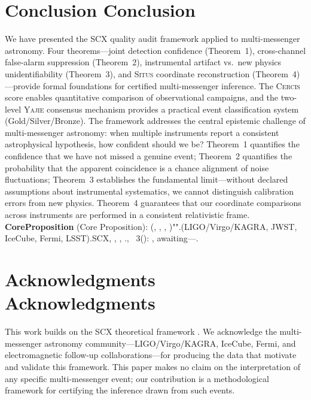 \documentclass[11pt,a4paper]{article}
\theoremstyle{definition}
\newcommand{\Situs}{\textsc{Situs}}
\newcommand{\Yajie}{\textsc{Yajie}}
\newcommand{\Cercis}{\textsc{Cercis}}
\newcommand{\SCX}{\textsc{SCX}}
\begin{document}
\section*{Conclusion Conclusion}
We have presented the \SCX{} quality audit framework applied to multi-messenger astronomy. Four theorems---joint detection confidence (Theorem~1), cross-channel false-alarm suppression (Theorem~2), instrumental artifact vs.\ new physics unidentifiability (Theorem~3), and \Situs{} coordinate reconstruction (Theorem~4)---provide formal foundations for certified multi-messenger inference. The \Cercis{} score enables quantitative comparison of observational campaigns, and the two-level \Yajie{} consensus mechanism provides a practical event classification system (Gold/Silver/Bronze).
The framework addresses the central epistemic challenge of multi-messenger astronomy: when multiple instruments report a consistent astrophysical hypothesis, how confident should we be? Theorem~1 quantifies the confidence that we have not missed a genuine event; Theorem~2 quantifies the probability that the apparent coincidence is a chance alignment of noise fluctuations; Theorem~3 establishes the fundamental limit---without declared assumptions about instrumental systematics, we cannot distinguish calibration errors from new physics. Theorem~4 guarantees that our coordinate comparisons across instruments are performed in a consistent relativistic frame.
\textbf{CoreProposition} (Core Proposition): (, , , )"".(LIGO/Virgo/KAGRA, JWST, IceCube, Fermi, LSST).\SCX{}, , , ., ~3(): , awaiting---.
\section*{Acknowledgments Acknowledgments}
This work builds on the \SCX{} theoretical framework \cite{SCX2025}. We acknowledge the multi-messenger astronomy community---LIGO/Virgo/KAGRA, IceCube, Fermi, and electromagnetic follow-up collaborations---for producing the data that motivate and validate this framework. This paper makes no claim on the interpretation of any specific multi-messenger event; our contribution is a methodological framework for certifying the inference drawn from such events.
\appendix
\end{document}
